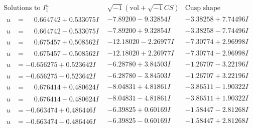 \documentclass[1p]{elsarticle_modified}
\theoremstyle{definition}
\newcommand{\I}{\sqrt{-1}}
\begin{document}
$$\begin{array}{c|c|c}  
\text{Solutions to }I^u_{1}& \I (\text{vol} + \sqrt{-1}CS) & \text{Cusp shape}\\
 \hline 
\begin{aligned}
u &= \phantom{-}0.664742 + 0.533075 I\end{aligned}
 & -7.89200 - 9.32854 I & -3.38258 + 7.74496 I \\ \hline\begin{aligned}
u &= \phantom{-}0.664742 - 0.533075 I\end{aligned}
 & -7.89200 + 9.32854 I & -3.38258 - 7.74496 I \\ \hline\begin{aligned}
u &= \phantom{-}0.675457 + 0.508562 I\end{aligned}
 & -12.18020 - 2.26977 I & -7.30774 + 2.96998 I \\ \hline\begin{aligned}
u &= \phantom{-}0.675457 - 0.508562 I\end{aligned}
 & -12.18020 + 2.26977 I & -7.30774 - 2.96998 I \\ \hline\begin{aligned}
u &= -0.656275 + 0.523642 I\end{aligned}
 & -6.28780 + 3.84503 I & -1.26707 - 3.22196 I \\ \hline\begin{aligned}
u &= -0.656275 - 0.523642 I\end{aligned}
 & -6.28780 - 3.84503 I & -1.26707 + 3.22196 I \\ \hline\begin{aligned}
u &= \phantom{-}0.676414 + 0.480624 I\end{aligned}
 & -8.04831 + 4.81861 I & -3.86511 - 1.90322 I \\ \hline\begin{aligned}
u &= \phantom{-}0.676414 - 0.480624 I\end{aligned}
 & -8.04831 - 4.81861 I & -3.86511 + 1.90322 I \\ \hline\begin{aligned}
u &= -0.663474 + 0.486446 I\end{aligned}
 & -6.39825 + 0.60169 I & -1.58447 - 2.81268 I \\ \hline\begin{aligned}
u &= -0.663474 - 0.486446 I\end{aligned}
 & -6.39825 - 0.60169 I & -1.58447 + 2.81268 I \\ \hline\begin{aligned}

\end{aligned}
\end{array}$$
\end{document}
